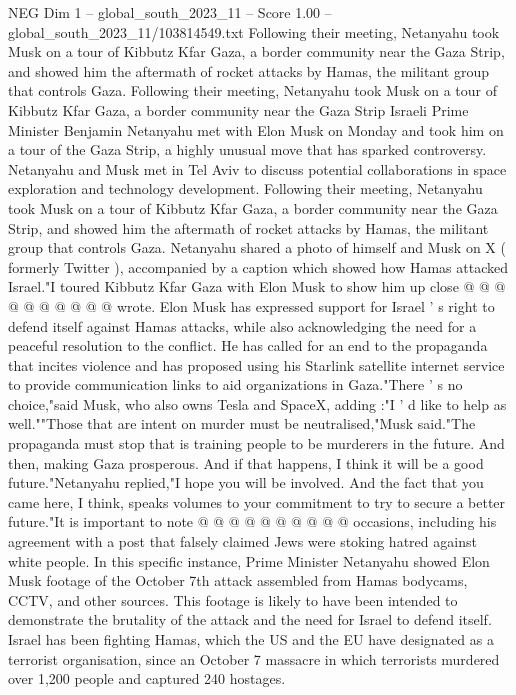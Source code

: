 \begin{textsample}{NEG Dim 1 – global\_south\_2023\_11 – Score 1.00 – global\_south\_2023\_11/103814549.txt}  \label{ex:f1_neg_320}
Following their meeting, Netanyahu took Musk on a tour of Kibbutz Kfar Gaza, a border community near the Gaza Strip, and showed him the aftermath of rocket attacks by Hamas, the militant group that controls Gaza.
Following their meeting, Netanyahu took Musk on a tour of Kibbutz Kfar Gaza, a border community near the Gaza Strip Israeli Prime Minister Benjamin Netanyahu met with Elon Musk on Monday and took him on a tour of the Gaza Strip, a highly unusual move that has sparked controversy.
Netanyahu and Musk met in Tel Aviv to discuss potential collaborations in space exploration and technology development.
Following their meeting, Netanyahu took Musk on a tour of Kibbutz Kfar Gaza, a border community near the Gaza Strip, and showed him the aftermath of rocket attacks by Hamas, the militant group that controls Gaza.
Netanyahu shared a photo of himself and Musk on X ( formerly Twitter ), accompanied by a caption which showed how Hamas attacked Israel."I toured Kibbutz Kfar Gaza with Elon Musk to show him up close @ @ @ @ @ @ @ @ @ @ wrote.
Elon Musk has expressed support for Israel ' s right to defend itself against Hamas attacks, while also acknowledging the need for a peaceful resolution to the conflict.
He has called for an end to the propaganda that incites violence and has proposed using his Starlink satellite internet service to provide communication links to aid organizations in Gaza."There ' s no choice,"said Musk, who also owns Tesla and SpaceX, adding :"I ' d like to help as well.""Those that are intent on murder must be neutralised,"Musk said."The propaganda must stop that is training people to be murderers in the future.
And then, making Gaza prosperous.
And if that happens, I think it will be a good future."Netanyahu replied,"I hope you will be involved.
And the fact that you came here, I think, speaks volumes to your commitment to try to secure a better future."It is important to note @ @ @ @ @ @ @ @ @ @ occasions, including his agreement with a post that falsely claimed Jews were stoking hatred against white people.
In this specific instance, Prime Minister Netanyahu showed Elon Musk footage of the October 7th attack assembled from Hamas bodycams, CCTV, and other sources.
This footage is likely to have been intended to demonstrate the brutality of the attack and the need for Israel to defend itself.
Israel has been fighting Hamas, which the US and the EU have designated as a terrorist organisation, since an October 7 massacre in which terrorists murdered over 1,200 people and captured 240 hostages.

\end{textsample}
